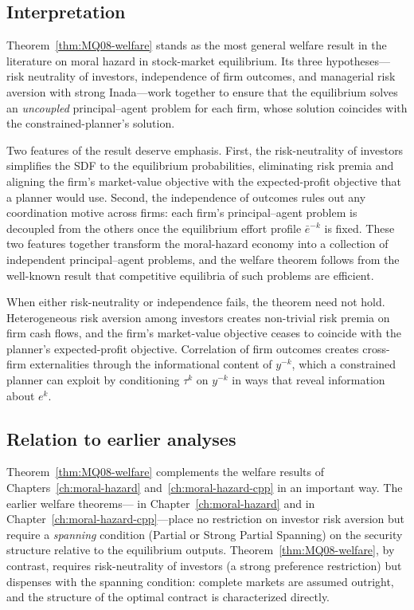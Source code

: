 \documentclass[11pt,a4paper,oneside]{book}
\theoremstyle{plain}
\theoremstyle{definition}
\theoremstyle{remark}
\numberwithin{equation}{chapter}
\begin{document}
\subsection{Interpretation}

Theorem~\ref{thm:MQ08-welfare} stands as the most general welfare result in the literature on moral hazard in stock-market equilibrium.
Its three hypotheses---risk neutrality of investors, independence of firm outcomes, and managerial risk aversion with strong Inada---work together to ensure that the equilibrium solves an \emph{uncoupled} principal--agent problem for each firm, whose solution coincides with the constrained-planner's solution.

Two features of the result deserve emphasis.
First, the risk-neutrality of investors simplifies the SDF to the equilibrium probabilities, eliminating risk premia and aligning the firm's market-value objective with the expected-profit objective that a planner would use.
Second, the independence of outcomes rules out any coordination motive across firms: each firm's principal--agent problem is decoupled from the others once the equilibrium effort profile $\bar{e}^{-k}$ is fixed.
These two features together transform the moral-hazard economy into a collection of independent principal--agent problems, and the welfare theorem follows from the well-known result that competitive equilibria of such problems are efficient.

When either risk-neutrality or independence fails, the theorem need not hold.
Heterogeneous risk aversion among investors creates non-trivial risk premia on firm cash flows, and the firm's market-value objective ceases to coincide with the planner's expected-profit objective.
Correlation of firm outcomes creates cross-firm externalities through the informational content of $y^{-k}$, which a constrained planner can exploit by conditioning $\tau^k$ on $y^{-k}$ in ways that reveal information about $e^k$.

\subsection{Relation to earlier analyses}

Theorem~\ref{thm:MQ08-welfare} complements the welfare results of Chapters~\ref{ch:moral-hazard} and~\ref{ch:moral-hazard-cpp} in an important way.
The earlier welfare theorems---\citet{MagillQuinzii2002} in Chapter~\ref{ch:moral-hazard} and \citet{BisinGottardiRuta2014} in Chapter~\ref{ch:moral-hazard-cpp}---place no restriction on investor risk aversion but require a \emph{spanning} condition (Partial or Strong Partial Spanning) on the security structure relative to the equilibrium outputs.
Theorem~\ref{thm:MQ08-welfare}, by contrast, requires risk-neutrality of investors (a strong preference restriction) but dispenses with the spanning condition: complete markets are assumed outright, and the structure of the optimal contract is characterized directly.
\end{document}
